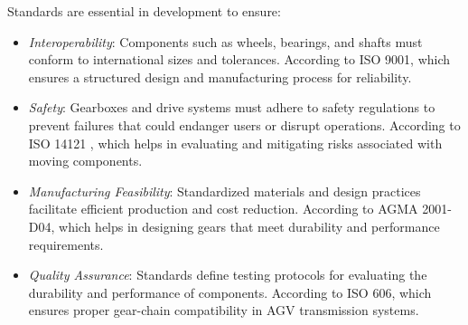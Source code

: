 \documentclass[../../main]{subfiles}
\begin{document}
Standards are essential in development to ensure:
\begin{itemize}
    \item \textit{Interoperability}: Components such as wheels, bearings, and shafts must conform to international sizes and tolerances. According to ISO 9001, which ensures a structured design and manufacturing process for reliability. 
    \item \textit{Safety}: Gearboxes and drive systems must adhere to safety regulations to prevent failures that could endanger users or disrupt operations. According to ISO 14121 ,  which helps in evaluating and mitigating risks associated with moving components.
    \item \textit{Manufacturing Feasibility}: Standardized materials and design practices facilitate efficient production and cost reduction. According to AGMA 2001-D04, which helps in designing gears that meet durability and performance requirements.
    \item \textit{Quality Assurance}: Standards define testing protocols for evaluating the durability and performance of components. According to ISO 606, which ensures proper gear-chain compatibility in AGV transmission systems.
\end{itemize}
\newpage




\end{document}

